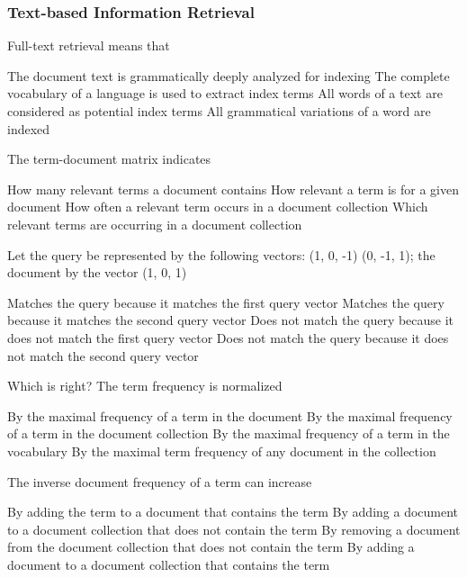 \documentclass[12pt,a4paper]{exam} %
\begin{document}
\subsubsection{Text-based Information Retrieval}
\begin{questions}
\question Full-text retrieval means that
\begin{checkboxes}
\choice The document text is grammatically deeply analyzed
for indexing
\choice The complete vocabulary of a language is used to
extract index terms
\CorrectChoice All words of a text are considered as potential index
terms
\choice All grammatical variations of a word are indexed
\end{checkboxes}

\question The term-document matrix indicates
\begin{checkboxes}
\choice How many relevant terms a document contains
\choice How relevant a term is for a given document
\CorrectChoice How often a relevant term occurs in a document
collection
\CorrectChoice Which relevant terms are occurring in a document
collection
\end{checkboxes}

\question Let the query be represented by the following vectors:
(1, 0, -1) (0, -1, 1); the document by the vector (1, 0, 1)
\begin{checkboxes}
\choice Matches the query because it matches the first query vector
\CorrectChoice Matches the query because it matches the second query vector
\choice Does not match the query because it does not match the first
query vector
\choice Does not match the query because it does not match the second
query vector
\end{checkboxes}

\question Which is right? The term frequency is normalized
\begin{checkboxes}
\CorrectChoice By the maximal frequency of a term in the document
\choice By the maximal frequency of a term in the document collection
\choice By the maximal frequency of a term in the vocabulary
\choice By the maximal term frequency of any document in the collection
\end{checkboxes}


\question The inverse document frequency of a term can increase
\begin{checkboxes}
\choice By adding the term to a document that contains the term
\CorrectChoice By adding a document to a document collection that does not
contain the term
\choice By removing a document from the document collection that
does not contain the term
\choice By adding a document to a document collection that contains
the term
\end{checkboxes}

\end{questions}
\end{document}
